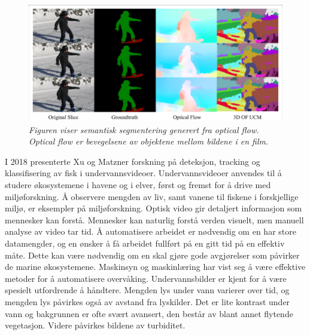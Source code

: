 \begin{figure}
\begin{center} 
\includegraphics[scale=0.45]{figures/optical_flow}
\caption{\small \sl Figuren viser semantisk segmentering generert fra optical flow. Optical flow er bevegelsene av objektene mellom bildene i en film. \cite{Lin 2019}
\label{fig:optical_flow}} 
\end{center} 
\end{figure} 

I 2018 presenterte Xu og Matzner forskning på deteksjon, tracking og klassifisering av fisk i undervannsvideoer. Undervannsvideoer anvendes til å studere økosystemene i havene og i elver, først og fremst for å drive med miljøforskning. Å observere mengden av liv, samt vanene til fiskene i forskjellige miljø, er eksempler på miljøforskning. Optisk video gir detaljert informasjon som mennesker kan forstå. Mennesker kan naturlig forstå verden visuelt, men manuell analyse av video tar tid. Å automatisere arbeidet er nødvendig om en har store datamengder, og en ønsker å få arbeidet fullført på en gitt tid på en effektiv måte. Dette kan være nødvendig om en skal gjøre gode avgjørelser som påvirker de marine økosystemene. Maskinsyn og maskinlæring har vist seg å være effektive metoder for å automatisere overvåking. Undervannsbilder er kjent for å være spesielt utfordrende å håndtere. Mengden lys under vann varierer over tid, og mengden lys påvirkes også av avstand fra lyskilder. Det er lite kontrast under vann og bakgrunnen er ofte svært avansert, den består av blant annet flytende vegetasjon. Videre påvirkes bildene av turbiditet. \cite{Xu og Matzner 2018}



